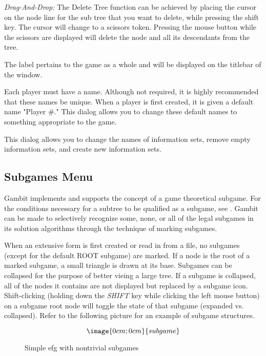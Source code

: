 {\begin{description}
{\em Drag-And-Drop:}  The Delete Tree function can be achieved by placing the cursor 
on the node line for the sub tree that you want to delete, while pressing the shift key.  
The cursor will change 
to a scissors token.  Pressing the mouse button while the scissors are displayed 
will delete the node and all its descendants from the tree. 
\item[Label]  The label pertains to the game as a whole and will be
displayed on the titlebar of the window.
\item[Players]  Each player must have a name.  Although not required, it
is highly recommended that these names be unique.  When a player is first
created, it is given a default name "Player \#."  This dialog allows you to
change these default names to something appropriate to the game.
\item[Infoset] This dialog allows you to change the names of information 
sets, remove empty information sets, and create new information sets.  
\end{description}

\subsection{Subgames Menu}\label{SubgamesMenu}
Gambit implements and supports the concept of a game theoretical
subgame. For the 
conditions necessary for a subtree to be qualified as a subgame, 
see \cite{Selten:1975}.  Gambit can be made to selectively recognize some,  
none, or all of the legal subgames in its solution algorithms through 
the technique of marking subgames.  

When an extensive form is first created or 
read in from a file, no subgames (except for the default ROOT subgame) are 
marked.  If a node is the root of a marked subgame, a small triangle is drawn at
its base.  Subgames can be collapsed for the purpose of better vieing a large tree.  
If a subgame is collapsed, all of the nodes it contains are not displayed but 
replaced by a subgame icon.  Shift-clicking
(holding down the {\em SHIFT} key while clicking the left mouse button) on a
subgame root node will toggle the state of that subgame (expanded vs. collapsed).
Refer to the following picture for an example of subgame structures. 


\begin{figure}
$$\image{0cm;0cm}{subgame}$$
\caption{Simple efg with nontrivial subgames}\label{fig_subgames}
\end{figure}

}
